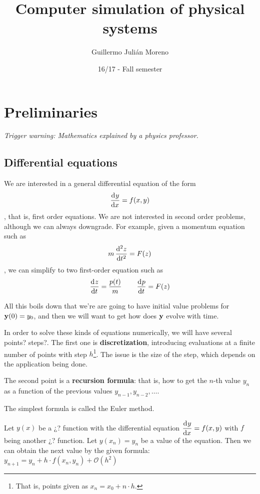 \documentclass[palatino]{epflnotes}
\title{Computer simulation of physical systems}
\author{Guillermo Julián Moreno}
\date{16/17 - Fall semester}
\begin{document}
\frontmatter
\pagestyle{plain}
\maketitle

\tableofcontents
\mainmatter

\chapter{Preliminaries}

\textit{Trigger warning: Mathematics explained by a physics professor.}

\section{Differential equations}

We are interested in a general differential equation of the form \[ \od{y}{x} = f(x,y) \], that is, first order equations. We are not interested in second order problems, although we can always downgrade. For example, given a momentum equation such as \[ m \od[2]{z}{t} = F(z) \], we can simplify to two first-order equation such as \[ \od{z}{t} = \frac{p(t)}{m} \qquad \od{p}{t} = F(z) \]

All this boils down that we're are going to have initial value problems for $\bold{y}(0) = y_0$, and then we will want to get how does $\bold{y}$ evolve with time.

In order to solve these kinds of equations numerically, we will have several points? steps?. The first one is \textbf{discretization}, introducing evaluations at a finite number of points with step $h$\footnote{That is, points given as $x_n = x_0 + n·h$.}. The issue is the size of the step, which depends on the application being done.

The second point is a \textbf{recursion formula}: that is, how to get the $n$-th value $y_n$ as a function of the previous values $y_{n-1}, y_{n-2}, \dotsc$.

The simplest formula is called the Euler method.

\begin{prop} \label{prop:EulerMethod} Let $y(x)$ be a ¿? function with the differential equation $\od{y}{x} = f(x,y)$ with $f$ being another ¿? function. Let $y(x_n) = y_n$ be a value of the equation. Then we can obtain the next value by the given formula: \( y_{n+1} = y_n + h · f(x_n, y_n) + \mathcal{O}(h^2) \)
\end{prop}
\end{document}
